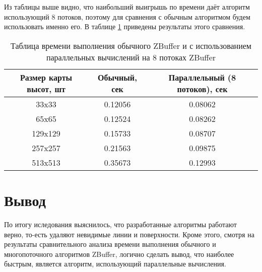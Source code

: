 \newpage
Из таблицы выше видно, что наибольший выигрышь по времени даёт алгоритм использующий 8 потоков, поэтому для сравнения с обычным алгоритмом будем использовать именно его. В таблице \ref{ZBufferCompareTable} приведены результаты этого сравнения.

\begin{table} [h!]
	\caption{Таблица времени выполнения обычного ZBuffer и с использованием параллельных вычислений на 8 потоках ZBuffer}
	\label{ZBufferCompareTable}
	\begin{center}
		\begin{tabular}{|c c c|} 
			\hline
			Размер карты высот, шт & Обычный, сек & Параллельный (8 потоков), сек\\  
			\hline
			33x33 & 0.12056 & 0.08062 \\
			\hline
			65x65 & 0.12524 & 0.08262 \\
			\hline
			129x129 & 0.15733 & 0.08707 \\
			\hline
			257x257 & 0.21563 & 0.09875 \\
			\hline
			513x513 & 0.35673 & 0.12993 \\
			\hline
		\end{tabular}
	\end{center}
\end{table}

\section{Вывод}
По итогу иследования выяснилось, что разработанные алгоритмы работают верно, то-есть удаляют невидимые линии и поверхности. Кроме этого, смотря на результаты сравнительного анализа времени выполнения обычного и многопоточного алгоритмов ZBuffer, логично сделать вывод, что наиболее быстрым, является алгоритм, использующий параллельные вычисления.